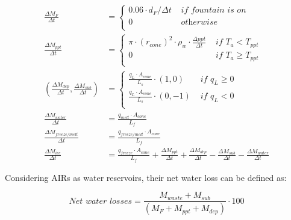 \documentclass[utf8]{frontiersSCNS}
\begin{document}
\begin{subequations}
	\begin{align}
		\frac{\Delta M_{F}}{\Delta t} & = \left\{ \begin{array}{ll} 0.06 \cdot d_F/\Delta t
			 & \textit{ if fountain is on} \\ 0 & \textit{ otherwise } \\\end{array} \right.                                             \\
		\label{eq:ppt}
		\frac{\Delta M_{ppt}}{\Delta t}                                    & = \left\{ \begin{array}{ll} \pi \cdot
        {(r_{cone})}^2 \cdot
			\rho_{w}\cdot \frac {\Delta ppt}{\Delta t} & \textit{ if } T_{a} < T_{ppt} \\ 0 & \textit{ if } T_{a} \geq T_{ppt} \\\end{array} \right.                                             \\
		\label{eq:vap}
		(\frac{\Delta M_{dep}}{\Delta t}, \frac{\Delta M_{sub}}{\Delta t}) & = \left\{ \begin{array}{ll} \frac{q_{L}
			\cdot A_{cone}}{L_s}\cdot (1,0)  & \textit{ if } q_{L} \geq 0 \\ \frac{q_{L}
			\cdot A_{cone}}{L_s}\cdot (0,-1) & \textit{ if } q_{L} < 0    \\\end{array} \right.                                             \\
		\label{eq:mwat}
		\frac{\Delta M_{water}}{\Delta t}                                  & = \frac{q_{melt} \cdot A_{cone} }{L_f}                                                   \\
	  \label{eq:m_freeze/melt}
    \frac{\Delta M_{freeze/melt}}{\Delta t} & = \frac{q_{freeze/melt} \cdot A_{cone} }{L_f} \\
		\label{eq:mcone}
		\frac{\Delta M_{ice}}{\Delta t}                                    & = \frac{q_{freeze}\cdot A_{cone} }{L_f} + \frac{\Delta M_{ppt}}{\Delta t} + \frac{\Delta
			M_{dep}}{\Delta t}- \frac{\Delta M_{sub}}{\Delta t}- \frac{\Delta M_{water}}{\Delta t}
	\end{align}
\end{subequations}

Considering AIRs as water reservoirs, their net water loss can be defined as:

\begin{equation} \textit{Net water losses} = \frac{M_{waste}+M_{sub}}{(M_F+M_{ppt}+M_{dep})} \cdot 100 \end{equation}
\end{document}
